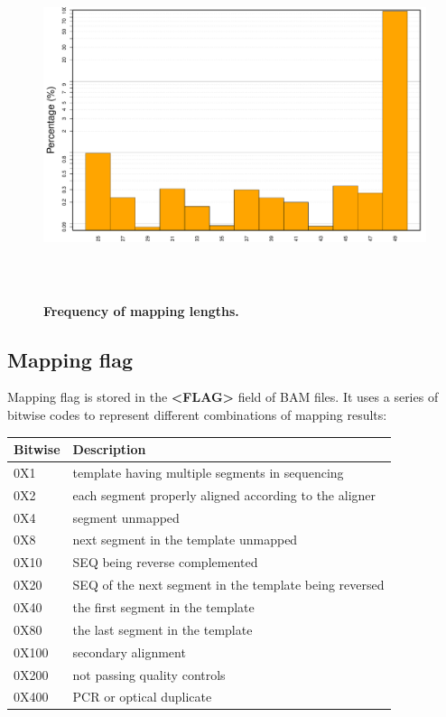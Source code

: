 \documentclass{article}
\begin{document}
\begin{center}
\begin{figure}[H]
\includegraphics[width=6.5in, height=4in]{bamchop-mapping-length}
\caption{\textbf{Frequency of mapping lengths.} }
\end{figure}
\end{center}

\subsection{Mapping flag}
Mapping flag is stored in the \textbf{<FLAG>} field of BAM files. It uses a series of bitwise codes to represent different combinations of mapping results:
\begin{center}
\begin{tabular}{ll}
  \hline
Bitwise & Description \\ 
  \hline
0X1 & template having multiple segments in sequencing \\ 
  0X2 & each segment properly aligned according to the aligner \\ 
  0X4 & segment unmapped \\ 
  0X8 & next segment in the template unmapped \\ 
  0X10 & SEQ being reverse complemented \\ 
  0X20 & SEQ of the next segment in the template being reversed \\ 
  0X40 & the first segment in the template \\ 
  0X80 & the last segment in the template \\ 
  0X100 & secondary alignment \\ 
  0X200 & not passing quality controls \\ 
  0X400 & PCR or optical duplicate \\ 
   \hline
\end{tabular}\end{center}
\end{document}
